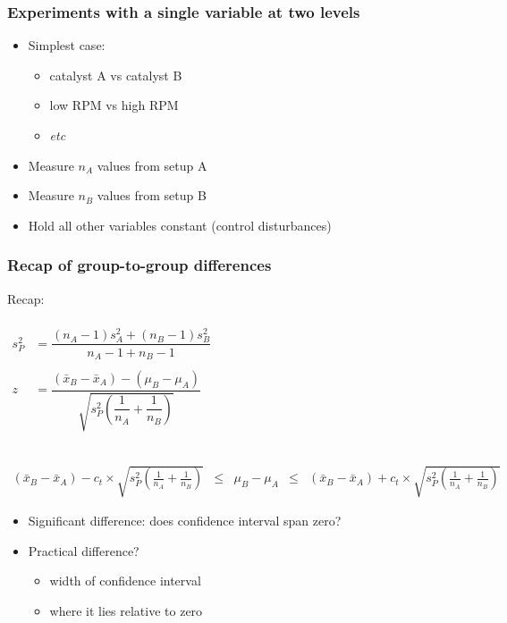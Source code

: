\begin{frame}\frametitle{Experiments with a single variable at two levels}
	\begin{itemize}
		\item	Simplest case:
		\begin{itemize}
			\item	catalyst A vs catalyst B
			\item	low RPM vs high RPM
			\item	\emph{etc}
		\end{itemize}
		\item	Measure $n_A$ values from setup A
		\item	Measure $n_B$ values from setup B
		\item	Hold all other variables constant (control disturbances)
	\end{itemize}
\end{frame}

\begin{frame}\frametitle{Recap of group-to-group differences}

	Recap:

	$
	\begin{array}{rcl}
		\\
		s_P^2 &= \dfrac{(n_A -1) s_A^2 + (n_B-1)s_B^2}{n_A - 1 + n_B - 1} \\
		& \\
		z &= \dfrac{(\bar{x}_B - \bar{x}_A) - (\mu_B - \mu_A)}{\sqrt{s_P^2 \left(\dfrac{1}{n_A} + \dfrac{1}{n_B}\right)}}\\
		\\
	\end{array}
	$

	$
	\begin{array}{rcccl}
		\\
		{\scriptstyle (\bar{x}_B - \bar{x}_A) - c_t} \times \sqrt{\scriptstyle s_P^2 \left(\frac{1}{n_A} + \frac{1}{n_B}\right)} &\leq& {\scriptstyle \mu_B - \mu_A} &\leq & {\scriptstyle (\bar{x}_B - \bar{x}_A) + c_t } \times \sqrt{\scriptstyle s_P^2 \left(\frac{1}{n_A} + \frac{1}{n_B}\right)}
	\end{array}
	$
	\begin{itemize}
		\item	Significant difference: does confidence interval span zero?
		\item	Practical difference?
		\begin{itemize}
			\item	width of confidence interval
			\item	where it lies relative to zero
		\end{itemize}
	\end{itemize}
\end{frame}

